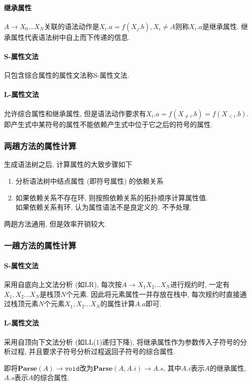 \documentclass{ctexart}
\begin{document}
\paragraph{继承属性} $A \to X_0 \ldots X_N$关联的语法动作是$X_i.a = f(X_j.b),X_i \neq A$则称$X_i.a$是继承属性.
    继承属性代表语法树中自上而下传递的信息.
\paragraph{S-属性文法} 只包含综合属性的属性文法称S-属性文法.
\paragraph{L-属性文法} 允许综合属性和继承属性, 但是语法动作要求有$X_i.a = f(X_{\neq i}.b) =f(X_{< i}.b)$.
    即产生式中某符号的属性不能依赖产生式中位于它之后的符号的属性.

\subsubsection{两趟方法的属性计算}
    生成语法树之后, 计算属性的大致步骤如下
    \begin{enumerate}
        \item 分析语法树中结点属性 (即符号属性) 的依赖关系
        \item 如果依赖关系不存在环, 则按照依赖关系的拓扑顺序计算属性值.\\
        如果依赖关系有环, 认为属性语法不是良定义的, 不予处理.\par
    \end{enumerate}
    两趟方法通用, 但是效率开销较大.

\subsubsection{一趟方法的属性计算}
\paragraph{S-属性文法} 采用自底向上文法分析 (如LR), 每次按$A \to X_1 X_2 \ldots X_N$进行规约时, 一定有$X_1, X_2 \ldots X_N$是栈顶$N$个元素.
    因此将元素属性一并存放在栈中, 每次规约时直接通过栈顶元素$N$个元素$X_1, X_2\ldots X_N$的属性计算$A.a$即可.
\paragraph{L-属性文法} \label{onepass-l-attr-grammar} 采用自顶向下文法分析 (如LL(1)递归下降),
    将继承属性作为参数传入子符号的分析过程, 并且要求子符号分析过程返回子符号的综合属性.\par
    即将$\mathbf{Parse}(A) \to \mathtt{void}$改为$\mathbf{Parse}(A, A.i) \to A.s$, 其中$A.i$表示$A$的继承属性, $A.s$表示$A$的综合属性.
\end{document}
